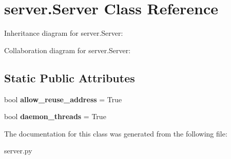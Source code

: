 \hypertarget{classserver_1_1Server}{}\section{server.\+Server Class Reference}
\label{classserver_1_1Server}


Inheritance diagram for server.\+Server\+:


Collaboration diagram for server.\+Server\+:
\subsection*{Static Public Attributes}
\begin{DoxyCompactItemize}
\item 
\mbox{\label{classserver_1_1Server_a7c1648959a23d4d8809c3998bd332d05}} 
bool {\bfseries allow\+\_\+reuse\+\_\+address} = True
\item 
\mbox{\label{classserver_1_1Server_abb009ef7bca9b51abe556105d2c3f18d}} 
bool {\bfseries daemon\+\_\+threads} = True
\end{DoxyCompactItemize}


The documentation for this class was generated from the following file\+:\begin{DoxyCompactItemize}
\item 
server.\+py\end{DoxyCompactItemize}
